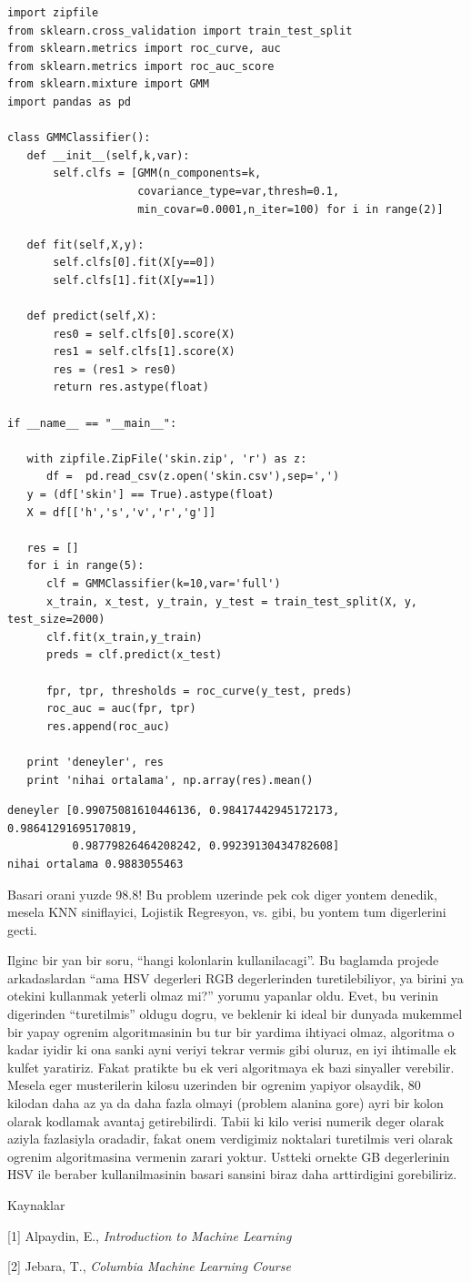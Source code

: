 \documentclass[12pt,fleqn]{article}\usepackage{../common}
\begin{document}
\begin{verbatim}
import zipfile
from sklearn.cross_validation import train_test_split
from sklearn.metrics import roc_curve, auc
from sklearn.metrics import roc_auc_score
from sklearn.mixture import GMM
import pandas as pd

class GMMClassifier():
   def __init__(self,k,var):
       self.clfs = [GMM(n_components=k,
                    covariance_type=var,thresh=0.1, 
                    min_covar=0.0001,n_iter=100) for i in range(2)]

   def fit(self,X,y):
       self.clfs[0].fit(X[y==0])
       self.clfs[1].fit(X[y==1])

   def predict(self,X):
       res0 = self.clfs[0].score(X)
       res1 = self.clfs[1].score(X)
       res = (res1 > res0)
       return res.astype(float)

if __name__ == "__main__": 
 
   with zipfile.ZipFile('skin.zip', 'r') as z:
      df =  pd.read_csv(z.open('skin.csv'),sep=',')
   y = (df['skin'] == True).astype(float)
   X = df[['h','s','v','r','g']]
   
   res = []   
   for i in range(5):
      clf = GMMClassifier(k=10,var='full')
      x_train, x_test, y_train, y_test = train_test_split(X, y, test_size=2000)
      clf.fit(x_train,y_train)
      preds = clf.predict(x_test)

      fpr, tpr, thresholds = roc_curve(y_test, preds)
      roc_auc = auc(fpr, tpr)
      res.append(roc_auc)

   print 'deneyler', res
   print 'nihai ortalama', np.array(res).mean()
\end{verbatim}

\begin{verbatim}
deneyler [0.99075081610446136, 0.98417442945172173, 0.98641291695170819,
          0.98779826464208242, 0.99239130434782608] 
nihai ortalama 0.9883055463
\end{verbatim}

Basari orani yuzde 98.8! Bu problem uzerinde pek cok diger yontem denedik,
mesela KNN siniflayici, Lojistik Regresyon, vs. gibi, bu yontem tum
digerlerini gecti. 

Ilginc bir yan bir soru, ``hangi kolonlarin kullanilacagi''. Bu baglamda
projede arkadaslardan ``ama HSV degerleri RGB degerlerinden
turetilebiliyor, ya birini ya otekini kullanmak yeterli olmaz mi?'' yorumu
yapanlar oldu. Evet, bu verinin digerinden ``turetilmis'' oldugu dogru, ve
beklenir ki ideal bir dunyada mukemmel bir yapay ogrenim algoritmasinin bu
tur bir yardima ihtiyaci olmaz, algoritma o kadar iyidir ki ona sanki ayni
veriyi tekrar vermis gibi oluruz, en iyi ihtimalle ek kulfet
yaratiriz. Fakat pratikte bu ek veri algoritmaya ek bazi sinyaller
verebilir. Mesela eger musterilerin kilosu uzerinden bir ogrenim yapiyor
olsaydik, 80 kilodan daha az ya da daha fazla olmayi (problem alanina gore)
ayri bir kolon olarak kodlamak avantaj getirebilirdi. Tabii ki kilo verisi
numerik deger olarak aziyla fazlasiyla oradadir, fakat onem verdigimiz
noktalari turetilmis veri olarak ogrenim algoritmasina vermenin zarari
yoktur. Ustteki ornekte GB degerlerinin HSV ile beraber kullanilmasinin
basari sansini biraz daha arttirdigini gorebiliriz.

Kaynaklar

[1] Alpaydin, E., {\em Introduction to Machine Learning}

[2] Jebara, T., {\em Columbia Machine Learning Course}
\end{document}
